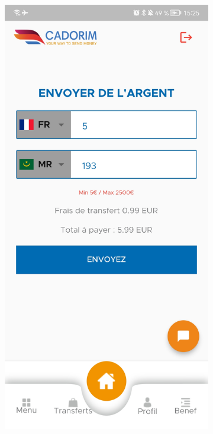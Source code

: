 \begin{itemize}[label=$\ast$]

\begin{figure}
	\centering
	\begin{subfigure}[b]{0.3\textwidth}
		\centering
		\includegraphics[width=\textwidth]{./Template LaTeX/Images/5.jpg}

\end{subfigure}
\end{figure}
\end{itemize}
